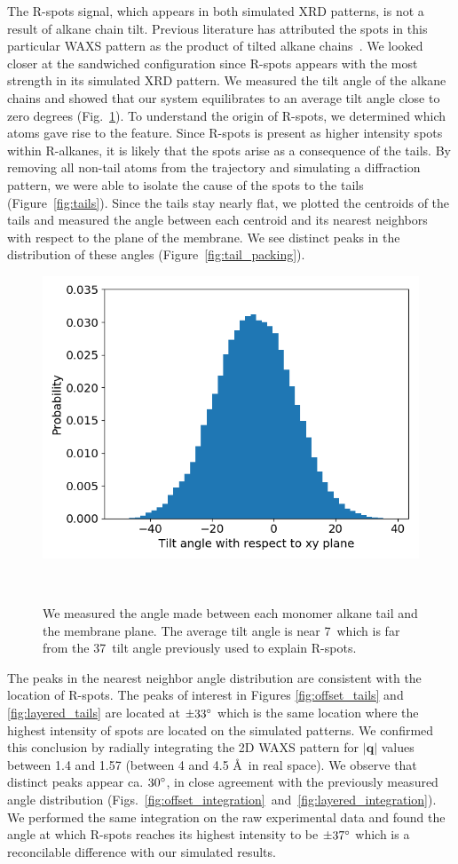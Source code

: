 \documentclass[journal=jpcbfk,manusciprt=article]{achemso}
\begin{document}
  The R-spots signal, which appears in both simulated XRD patterns, is not a
  result of alkane chain tilt. Previous literature has attributed the spots in
  this particular WAXS pattern as the product of tilted alkane
  chains~\cite{feng_scalable_2014}. We looked closer at the sandwiched
  configuration since R-spots appears with the most strength in its simulated XRD
  pattern. We measured the tilt angle of the alkane chains and showed that our
  system equilibrates to an average tilt angle close to zero degrees
  (Fig.~\ref{fig:tilt}). To understand the origin of R-spots, we determined which
  atoms gave rise to the feature. Since R-spots is present as higher intensity
  spots within R-alkanes, it is likely that the spots arise as a consequence of
  the tails. By removing all non-tail atoms from the trajectory and simulating a
  diffraction pattern, we were able to isolate the cause of the spots to the
  tails (Figure~\ref{fig:tails}). Since the tails stay nearly flat, we plotted
  the centroids of the tails and measured the angle between each centroid and its
  nearest neighbors with respect to the plane of the membrane.  We see distinct
  peaks in the distribution of these angles (Figure~\ref{fig:tail_packing}).

  \begin{figure}
  \centering
  \includegraphics[width=0.5\linewidth]{tilt_dist.png}
  \caption{We measured the angle made between each monomer alkane tail and the
	  membrane plane. The average tilt angle is near 7\degree~which is far from the
	  37\degree~tilt angle previously used to explain R-spots.}~\label{fig:tilt}
  \end{figure}

  The peaks in the nearest neighbor angle distribution are consistent with the
  location of R-spots. The peaks of interest in Figures \ref{fig:offset_tails}
  and \ref{fig:layered_tails} are located at $\pm 33 \degree$ which is the same
  location where the highest intensity of spots are located on the simulated
  patterns. We confirmed this conclusion by radially integrating the 2D WAXS
  pattern for $\left|\mathbf{q}\right|$ values between 1.4 and 1.57 (between 4
  and 4.5 \AA~in real space). We observe that distinct peaks appear ca. $30
  \degree$, in close agreement with the previously measured angle distribution
  (Figs.~\ref{fig:offset_integration}~and~\ref{fig:layered_integration}). We
  performed the same integration on the raw experimental data and found the angle
  at which R-spots reaches its highest intensity to be $\pm 37 \degree$ which
  is a reconcilable difference with our simulated results.
\end{document}
